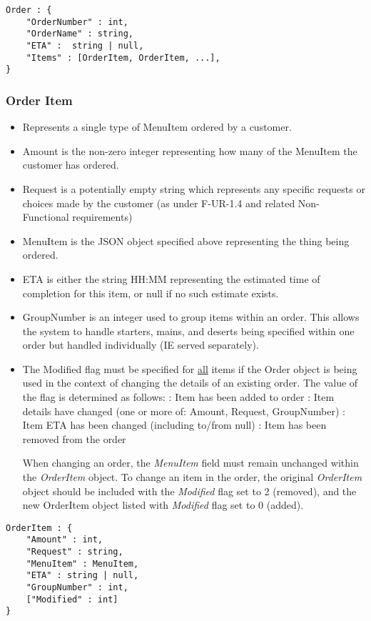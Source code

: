 \documentclass[12pt, a4paper]{article}
\begin{document}
\begin{verbatim}
Order : {
	"OrderNumber" : int,
	"OrderName" : string,
	"ETA" :  string | null,
	"Items" : [OrderItem, OrderItem, ...],
}
\end{verbatim}
\pagebreak
\subsubsection{Order Item}\label{subsubsec:OrderItem}

\begin{itemize}
\item Represents a single type of MenuItem ordered by a customer.
\item Amount is the non-zero integer representing how many of the MenuItem the customer has ordered.
\item Request is a potentially empty string which represents any specific requests or choices made by the customer (as under F-UR-1.4 and related Non-Functional requirements)
\item MenuItem is the JSON object specified above representing the thing being ordered.
\item ETA is either the string HH:MM representing the estimated time of completion for this item, or null if no such estimate exists.
\item GroupNumber is an integer used to group items within an order. This allows the system to handle starters, mains, and deserts being specified within one order but handled individually (IE served separately).
\item The Modified flag must be specified for \underline{all} items if the Order object is being used in the context of changing the details of an existing order. The value of the flag is determined as follows:
 : Item has been added to order
 : Item details have changed (one or more of: Amount, Request, GroupNumber)
 : Item ETA has been changed (including to/from null)
 : Item has been removed from the order

When changing an order, the \textit{MenuItem} field must remain unchanged within the \textit{OrderItem} object. To change an item in the order, the original \textit{OrderItem} object should be included with the \textit{Modified} flag set to 2 (removed), and the new OrderItem object listed with \textit{Modified} flag set to 0 (added).
\end{itemize}

\begin{verbatim}
OrderItem : {
	"Amount" : int,
	"Request" : string,
	"MenuItem" : MenuItem,
	"ETA" : string | null,
	"GroupNumber" : int,
	["Modified" : int]
}
\end{verbatim}
\end{document}
